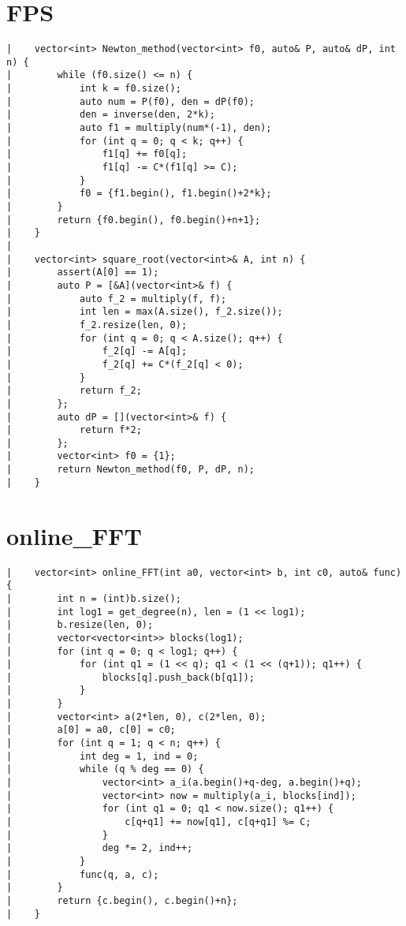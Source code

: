 \documentclass[a4paper, 10pt]{article}
\begin{document}
\begin{center}
\section*{FPS}
\begin{verbatim}
|    vector<int> Newton_method(vector<int> f0, auto& P, auto& dP, int n) {
|        while (f0.size() <= n) {
|            int k = f0.size();
|            auto num = P(f0), den = dP(f0);
|            den = inverse(den, 2*k);
|            auto f1 = multiply(num*(-1), den);
|            for (int q = 0; q < k; q++) {
|                f1[q] += f0[q];
|                f1[q] -= C*(f1[q] >= C);
|            }
|            f0 = {f1.begin(), f1.begin()+2*k};
|        }
|        return {f0.begin(), f0.begin()+n+1};
|    }
|    
|    vector<int> square_root(vector<int>& A, int n) {
|        assert(A[0] == 1);
|        auto P = [&A](vector<int>& f) {
|            auto f_2 = multiply(f, f);
|            int len = max(A.size(), f_2.size());
|            f_2.resize(len, 0);
|            for (int q = 0; q < A.size(); q++) {
|                f_2[q] -= A[q];
|                f_2[q] += C*(f_2[q] < 0);
|            }
|            return f_2;
|        };
|        auto dP = [](vector<int>& f) {
|            return f*2;
|        };
|        vector<int> f0 = {1};
|        return Newton_method(f0, P, dP, n);
|    }
\end{verbatim}

\section*{online\_FFT}
\begin{verbatim}
|    vector<int> online_FFT(int a0, vector<int> b, int c0, auto& func) {
|        int n = (int)b.size();
|        int log1 = get_degree(n), len = (1 << log1);
|        b.resize(len, 0);
|        vector<vector<int>> blocks(log1);
|        for (int q = 0; q < log1; q++) {
|            for (int q1 = (1 << q); q1 < (1 << (q+1)); q1++) {
|                blocks[q].push_back(b[q1]);
|            }
|        }
|        vector<int> a(2*len, 0), c(2*len, 0);
|        a[0] = a0, c[0] = c0;
|        for (int q = 1; q < n; q++) {
|            int deg = 1, ind = 0;
|            while (q % deg == 0) {
|                vector<int> a_i(a.begin()+q-deg, a.begin()+q);
|                vector<int> now = multiply(a_i, blocks[ind]);
|                for (int q1 = 0; q1 < now.size(); q1++) {
|                    c[q+q1] += now[q1], c[q+q1] %= C;
|                }
|                deg *= 2, ind++;
|            }
|            func(q, a, c);
|        }
|        return {c.begin(), c.begin()+n};
|    }
\end{verbatim}


\end{center}
\end{document}
